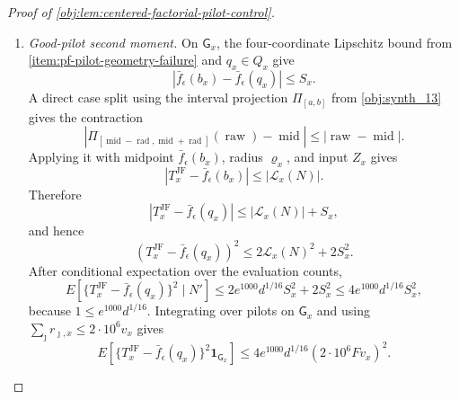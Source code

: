 \documentclass[11pt]{article}
\begin{document}
\begin{proof}[Proof of \cref{obj:lem:centered-factorial-pilot-control}]
\begin{enumerate}
\[+\operatorname{rad}(\operatorname{raw}-\operatorname{mid})
+\operatorname{rad}^2\ge0,
\]
and the case \(\operatorname{raw}>\operatorname{mid}+\operatorname{rad}\) is identical with the middle sign reversed.  Applying this with midpoint \(\bar f_\epsilon(b_x)\), radius \(\varrho_x\), and input \(Z_x\), and using
\(Z_x-\bar f_\epsilon(b_x)=\mathcal L_x(N)\), gives
\[
|T_x^{\mathrm{JF}}-Z_x|
\le
\frac{\mathcal L_x(N)^2}{\varrho_x}.
\]
Using the factorial \(L_2\) bound from \cref{item:pf-good-pilot-factorial-ltwo},
\[
|E(T_x^{\mathrm{JF}}-Z_x\mid N')|
\le
\frac{e^{1000}d^{1/16}S_x^2}{d^{1/4}S_x}
=
e^{1000}F d^{-3/16}\sum_{\jmath\in\mathcal J}r_{\jmath,x}.
\]
Together with the good-pilot radius bound and \(L^2d^{-3/16}\le225\), this implies
\[
\left|
E(T_x^{\mathrm{JF}}\mid N')-\bar f_\epsilon(q_x)
\right|
\le
\{5\cdot10^{16}C_J+450000000\,e^{1000}F\}\eta_x
\qquad\text{on }\mathsf G_x .
\]

\item \emph{Good-pilot second moment.}
On \(\mathsf G_x\), the four-coordinate Lipschitz bound from \cref{item:pf-pilot-geometry-failure} and
\(q_x\in Q_x\) give
\[
|\bar f_\epsilon(b_x)-\bar f_\epsilon(q_x)|\le S_x .
\]
A direct case split using the interval projection \(\Pi_{[a,b]}\) from \cref{obj:synth_13} gives the contraction
\[
\left|
\Pi_{[\operatorname{mid}-\operatorname{rad},\operatorname{mid}+\operatorname{rad}]}
(\operatorname{raw})-\operatorname{mid}
\right|
\le
|\operatorname{raw}-\operatorname{mid}|.
\]
Applying it with midpoint \(\bar f_\epsilon(b_x)\), radius \(\varrho_x\), and input \(Z_x\) gives
\[
|T_x^{\mathrm{JF}}-\bar f_\epsilon(b_x)|
\le |\mathcal L_x(N)|.
\]
Therefore
\[
|T_x^{\mathrm{JF}}-\bar f_\epsilon(q_x)|
\le |\mathcal L_x(N)|+S_x,
\]
and hence
\[
(T_x^{\mathrm{JF}}-\bar f_\epsilon(q_x))^2
\le
2\mathcal L_x(N)^2+2S_x^2.
\]
After conditional expectation over the evaluation counts,
\[
E\!\left[
\{T_x^{\mathrm{JF}}-\bar f_\epsilon(q_x)\}^2
\mid N'
\right]
\le
2e^{1000}d^{1/16}S_x^2+2S_x^2
\le
4e^{1000}d^{1/16}S_x^2,
\]
because \(1\le e^{1000}d^{1/16}\).  Integrating over pilots on \(\mathsf G_x\) and using
\(\sum_{\jmath}r_{\jmath,x}\le2\cdot10^6v_x\) gives
\[
E\!\left[
\{T_x^{\mathrm{JF}}-\bar f_\epsilon(q_x)\}^2\mathbf 1_{\mathsf G_x}
\right]
\le
4e^{1000}d^{1/16}(2\cdot10^6Fv_x)^2 .
\]


\end{enumerate}
\end{proof}
\end{document}
